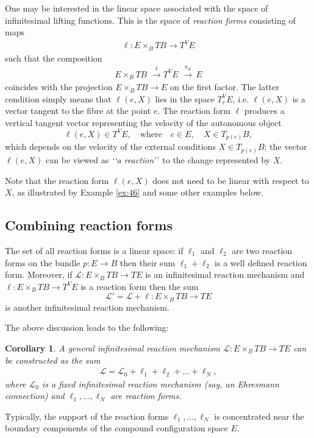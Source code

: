 \documentclass[11pt]{amsart}
\newtheorem{corollary}[theorem]{Corollary}
\begin{document}
{One may be interested in the linear space associated with the space of infinitesimal lifting functions. This is the space of {\it reaction forms} consisting of maps
\begin{eqnarray}
\ell: E\times_BTB \to T^{V}E
\end{eqnarray}
such that the composition
\begin{eqnarray}
E\times_B TB\, \, \stackrel{\ell} \to T^VE\, \,  \stackrel{\pi_E}\to\,  E
\end{eqnarray}
coincides with the projection $ E\times_B TB\to E$ on the first factor. The latter condition simply means that $\ell(e, X)$ lies in the space $T^V_eE$, i.e. $\ell(e, X)$ is a vector tangent to the fibre at  the point $e$. 
The reaction form $\ell$ produces a vertical tangent vector representing the velocity of the autonomous object 
$$\ell(e, X)\in T^VE, \quad \mbox{where}\quad e\in E, \quad X\in T_{p(e)}B,$$ 
which depends on the velocity of the external conditions $X\in T_{p(e)}B$; the vector  $\ell(e, X)$ can be viewed as {\it \lq\lq a reaction\rq\rq}\ to the change represented by $X$.

Note that the reaction form $\ell(e, X)$ does not need to be linear with respect to $X$, as illustrated by Example \ref{ex:46} and some other examples below. 


\subsection{Combining reaction forms}
The set of all reaction forms is a linear space: 
if $\ell_1$ and $\ell_2$ are two reaction forms on the bundle $p:E\to B$ then their sum $\ell_1+\ell_2$ is a well defined reaction form. Moreover, if 
$\mathcal L: E\times_BTB\to TE$ is an infinitesimal reaction mechanism 
and $\ell:  E\times_BTB \to T^VE$ is a reaction form 
then the sum 
$$\mathcal L' = \mathcal L+\ell: E\times_BTB\to TE$$ 
is another infinitesimal reaction mechanism. 

 The above discussion leads to the following:
\begin{corollary}\label{cor:45}
A general infinitesimal reaction mechanism $\mathcal L: E\times_BTB\to TE$ can be constructed as the sum
\begin{eqnarray}
\mathcal L= \mathcal L_0+ \ell_1+\ell_2+\dots+\ell_N,
\end{eqnarray}
where $\mathcal L_0$ is a fixed infinitesimal reaction mechanism (say, an Ehresmann connection) and $\ell_1, \dots, \ell_N$ are reaction forms. 
\end{corollary}
Typically, the support of the reaction forms $\ell_1, \dots, \ell_N$ is concentrated near the boundary components of the compound configuration space $E$. 


}
\end{document}
